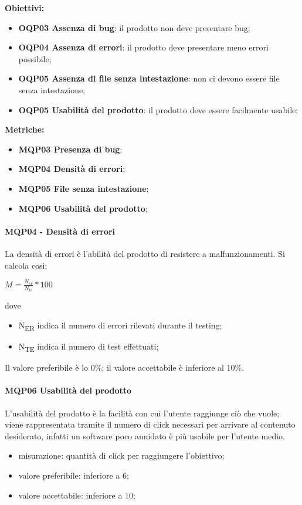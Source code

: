 \documentclass[../piano_di_qualifica.tex]{subfiles}
\begin{document}
\smallbreak
\textbf{Obiettivi:}
\smallbreak
\begin{itemize}
	\item \textbf{OQP03 Assenza di bug}: il prodotto non deve presentare bug;
	\item \textbf{OQP04 Assenza di errori}: il prodotto deve presentare meno errori possibile;
	\item \textbf{OQP05 Assenza di file senza intestazione}: non ci devono essere file senza intestazione;
	\item \textbf{OQP05 Usabilità del prodotto}: il prodotto deve essere facilmente usabile;
\end{itemize}

\textbf{Metriche:}
\smallbreak
\begin{itemize}
	\item \textbf{MQP03 Presenza di bug};
	\item \textbf{MQP04 Densità di errori};
	\item \textbf{MQP05 File senza intestazione};
	\item \textbf{MQP06 Usabilità del prodotto};
\end{itemize}


\paragraph{MQP04 - Densità di errori}
La densità di errori è l'abilità del prodotto di resistere a malfunzionamenti. Si calcola così:\par

\begin{center}
	$M = \frac{N_{er}}{N_{te}} * 100$
\end{center}

dove
\smallbreak
\begin{itemize}
	\item N\textsubscript{ER} indica il numero di errori rilevati durante il testing;
	\item N\textsubscript{TE} indica il numero di test effettuati;
\end{itemize}

Il valore preferibile è lo 0\%; il valore accettabile è inferiore al 10\%.

\paragraph{MQP06 Usabilità del prodotto}
L'usabilità del prodotto è la facilità con cui l’utente raggiunge ciò che vuole; viene rappresentata tramite il numero di click necessari per arrivare al contenuto desiderato, infatti un software poco annidato è più usabile per l'utente medio.
\smallbreak
\begin{itemize}
	\item misurazione: quantità di click per raggiungere l'obiettivo;
	\item valore preferibile: inferiore a 6;
	\item valore accettabile: inferiore a 10;
\end{itemize}
\end{document}
